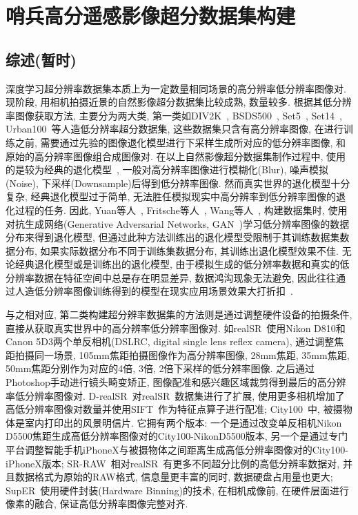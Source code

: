 \section{哨兵高分遥感影像超分数据集构建}

\subsection{综述(暂时)}

深度学习超分辨率数据集本质上为一定数量相同场景的高分辨率低分辨率图像对. 现阶段, 用相机拍摄近景的自然影像超分数据集比较成熟, 数量较多. 根据其低分辨率图像获取方法, 主要分为两大类, 第一类如DIV2K~\cite{DIV2K}, BSDS500~\cite{BSDS500}, Set5~\cite{Set5}, Set14~\cite{Set14}, Urban100~\cite{Urban100}等人造低分辨率超分数据集, 这些数据集只含有高分辨率图像, 在进行训练之前, 需要通过先验的图像退化模型进行下采样生成所对应的低分辨率图像, 和原始的高分辨率图像组合成图像对. 在以上自然影像超分数据集制作过程中, 使用的是较为经典的退化模型~\cite{classicDM}, 一般对高分辨率图像进行模糊化(Blur), 噪声模拟(Noise), 下采样(Downsample)后得到低分辨率图像. 然而真实世界的退化模型十分复杂, 经典退化模型过于简单, 无法胜任模拟现实中高分辨率到低分辨率图像的退化过程的任务. 因此, Yuan等人~\cite{CinCycleGAN}, Fritsche等人~\cite{DSGAN}, Wang等人~\cite{DASR}, 构建数据集时, 使用对抗生成网络(Generative Adversarial Networks, GAN~\cite{GAN})学习低分辨率图像的数据分布来得到退化模型, 但通过此种方法训练出的退化模型受限制于其训练数据集数据分布, 如果实际数据分布不同于训练集数据分布, 其训练出退化模型效果不佳. 无论经典退化模型或是训练出的退化模型, 由于模拟生成的低分辨率数据和真实的低分辨率数据在特征空间中总是存在明显差异, 数据鸿沟现象无法避免, 因此往往通过人造低分辨率图像训练得到的模型在现实应用场景效果大打折扣~\cite{SupER}.

与之相对应, 第二类构建超分辨率数据集的方法则是通过调整硬件设备的拍摄条件, 直接从获取真实世界中的高分辨率低分辨率图像对. 如realSR~\cite{realSR}使用Nikon D810和Canon 5D3两个单反相机(DSLRC,  digital single lens reflex camera), 通过调整焦距拍摄同一场景, 105mm焦距拍摄图像作为高分辨率图像, 28mm焦距, 35mm焦距, 50mm焦距分别作为对应的4倍, 3倍, 2倍下采样的低分辨率图像. 之后通过Photoshop手动进行镜头畸变矫正, 图像配准和感兴趣区域裁剪得到最后的高分辨率低分辨率图像对. D-realSR~\cite{D-realSR}对realSR~\cite{realSR}数据集进行了扩展, 使用更多相机增加了高低分辨率图像对数量并使用SIFT~\cite{SIFT}作为特征点算子进行配准; City100~\cite{city100}中, 被摄物体是室内打印出的风景明信片. 它拥有两个版本: 一个是通过改变单反相机Nikon D5500焦距生成高低分辨率图像对的City100-NikonD5500版本, 另一个是通过专门平台调整智能手机iPhoneX与被摄物体之间距离生成高低分辨率图像对的City100-iPhoneX版本; SR-RAW~\cite{SR-RAW}相对realSR~\cite{realSR}有更多不同超分比例的高低分辨率数据对, 并且数据格式为原始的RAW格式, 信息量更丰富的同时, 数据硬盘占用量也更大; SupER~\cite{SupER}使用硬件封装(Hardware Binning)的技术, 在相机成像前, 在硬件层面进行像素的融合, 保证高低分辨率图像完整对齐. 


